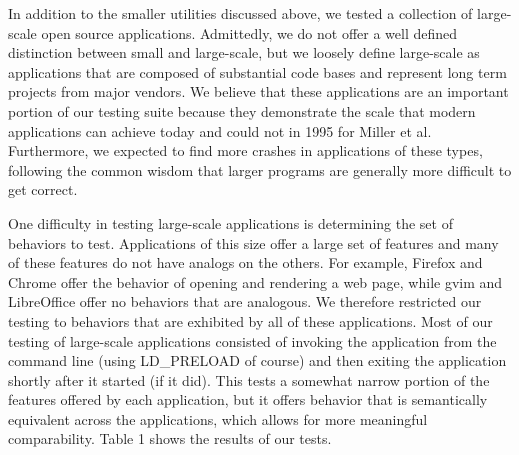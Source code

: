 In addition to the smaller utilities discussed above, we tested a collection of large-scale open source applications. Admittedly, we do not offer a well defined distinction between small and large-scale, but we loosely define large-scale as applications that are composed of substantial code bases and represent long term projects from major vendors. We believe that these applications are an important portion of our testing suite because they demonstrate the scale that modern applications can achieve today and could not in 1995 for Miller et al. Furthermore, we expected to find more crashes in applications of these types, following the common wisdom that larger programs are generally more difficult to get correct.


One difficulty in testing large-scale applications is determining the set of behaviors to test. Applications of this size offer a large set of features and many of these features do not have analogs on the others. For example, Firefox and Chrome offer the behavior of opening and rendering a web page, while gvim and LibreOffice offer no behaviors that are analogous. We therefore restricted our testing to behaviors that are exhibited by all of these applications. Most of our testing of large-scale applications consisted of invoking the application from the command line (using LD\_PRELOAD of course) and then exiting the application shortly after it started (if it did). This tests a somewhat narrow portion of the features offered by each application, but it offers behavior that is semantically equivalent across the applications, which allows for more meaningful comparability. Table 1 shows the results of our tests.

